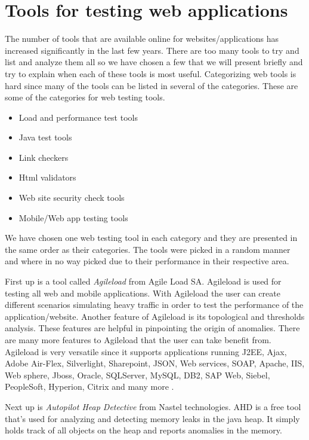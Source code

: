 \documentclass[a4paper]{article}
\begin{document}
\section{Tools for testing web applications}

 The number of tools that are available online for websites/applications has increased significantly in the last few years. There are too many tools to try and list and analyze them all so we have chosen a few that we will present briefly and try to explain when each of these tools is most useful. 
 Categorizing web tools is hard since many of the tools can be listed in several of the categories. These are some of the categories for web testing tools.  

 \begin {itemize}
 \item Load and performance test tools  
 \item Java test tools 
 \item Link checkers 
 \item Html validators 
 \item Web site security check tools 
 \item Mobile/Web app testing tools
 \end {itemize}
 
We have chosen one web testing tool in each category and they are presented in the same order as their categories. 
The tools were picked in a random manner and where in no way picked due to their performance in their respective area.
 
First up is a tool called \emph {Agileload} from Agile Load SA. Agileload is used for testing all web and mobile applications.
With Agileload the user can create different scenarios simulating heavy traffic in order to test the performance of the
application/website. Another feature of Agileload is its topological and thresholds analysis. These features are helpful 
in pinpointing the origin of anomalies. There are many more features to Agileload that the user can take benefit from.
Agileload is very versatile since
it supports
applications
running J2EE,
Ajax, Adobe Air-Flex, Silverlight, Sharepoint, JSON, 
Web services, SOAP, Apache, IIS, Web sphere, Jboss, Oracle, SQLServer, MySQL, DB2, SAP Web, Siebel, PeopleSoft, Hyperion, 
Citrix and
many more \cite{agileload}.
 
Next up is \emph{Autopilot Heap Detective} from Nastel technologies.
AHD is a free tool that's used for analyzing and detecting 
memory leaks in the java heap. It simply holds track of all objects on the heap and reports anomalies in the memory. \cite{ahd}
 
\end{document}
